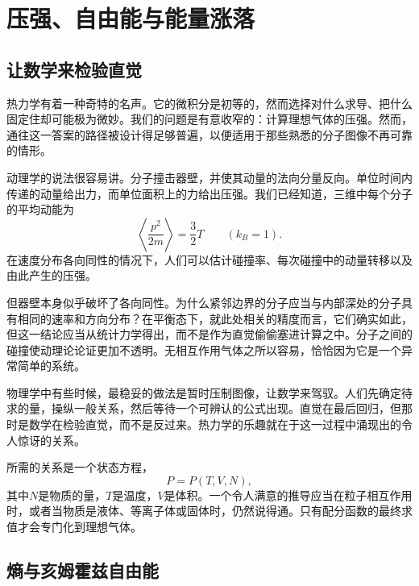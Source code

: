\chapter{压强、自由能与能量涨落}


\section{让数学来检验直觉}

热力学有着一种奇特的名声。它的微积分是初等的，然而选择对什么求导、把什么固定住却可能极为微妙。我们的问题是有意收窄的：计算理想气体的压强。然而，通往这一答案的路径被设计得足够普遍，以便适用于那些熟悉的分子图像不再可靠的情形。

动理学的说法很容易讲。分子撞击器壁，并使其动量的法向分量反向。单位时间内传递的动量给出力，而单位面积上的力给出压强。我们已经知道，三维中每个分子的平均动能为
\begin{equation}
 \left\langle \frac{p^2}{2m}\right\rangle=\frac{3}{2}T
 \qquad (k_B=1).
 \label{eq:sm5-mean-kinetic-energy}
\end{equation}
在速度分布各向同性的情况下，人们可以估计碰撞率、每次碰撞中的动量转移以及由此产生的压强。

但器壁本身似乎破坏了各向同性。为什么紧邻边界的分子应当与内部深处的分子具有相同的速率和方向分布？在平衡态下，就此处相关的精度而言，它们确实如此，但这一结论应当从统计力学得出，而不是作为直觉偷偷塞进计算之中。分子之间的碰撞使动理论论证更加不透明。无相互作用气体之所以容易，恰恰因为它是一个异常简单的系统。

物理学中有些时候，最稳妥的做法是暂时压制图像，让数学来驾驭。人们先确定待求的量，操纵一般关系，然后等待一个可辨认的公式出现。直觉在最后回归，但那时是数学在检验直觉，而不是反过来。热力学的乐趣就在于这一过程中涌现出的令人惊讶的关系。

所需的关系是一个状态方程，
\begin{equation}
 P=P(T,V,N),
 \label{eq:sm5-equation-of-state-target}
\end{equation}
其中\(N\)是物质的量，\(T\)是温度，\(V\)是体积。一个令人满意的推导应当在粒子相互作用时，或者当物质是液体、等离子体或固体时，仍然说得通。只有配分函数的最终求值才会专门化到理想气体。

\section{熵与亥姆霍兹自由能}

